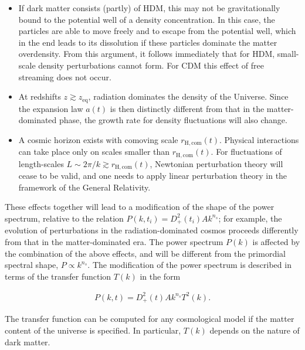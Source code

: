 \documentclass[a4paper,11pt]{article}
\begin{document}
\begin{itemize}
    \item If dark matter consists (partly) of HDM, this may not be gravitationally bound to the potential well of a density concentration. In this case, the particles are able to move freely and to escape from the potential well, which in the end leads to its dissolution if these particles dominate the matter overdensity. From this argument, it follows immediately that for HDM, small-scale density perturbations cannot form. For CDM this effect of free streaming does not occur.
    \item At redshifts $z\gtrsim z_\mathrm{eq}$, radiation dominates the density of the Universe. Since the expansion law $a(t)$ is then distinctly different from that in the matter-dominated phase, the growth rate for density fluctuations will also change.
    \item A cosmic horizon exists with comoving scale $r_\mathrm{H,com}(t)$. Physical interactions can take place only on scales smaller than $r_\mathrm{H,com}(t)$. For fluctuations of length-scales $L\sim2\pi/k\gtrsim r_\mathrm{H,com}(t)$, Newtonian perturbation theory will cease to be valid, and one needs to apply linear perturbation theory in the framework of the General Relativity.
\end{itemize}

{\noindent}These effects together will lead to a modification of the shape of the power spectrum, relative to the relation $P(k,t_i)=D_+^2(t_i)Ak^{n_s}$; for example, the evolution of perturbations in the radiation-dominated cosmos proceeds differently from that in the matter-dominated era. The power spectrum $P(k)$ is affected by the combination of the above effects, and will be different from the primordial spectral shape, $P\propto k^{n_s}$. The modification of the power spectrum is described in terms of the transfer function $T(k)$ in the form

\begin{align*}
    P(k,t) = D_+^2(t) Ak^{n_s}T^2(k).
\end{align*}

{\noindent}The transfer function can be computed for any cosmological model if the matter content of the universe is specified. In particular, $T(k)$ depends on the nature of dark matter.
\end{document}
